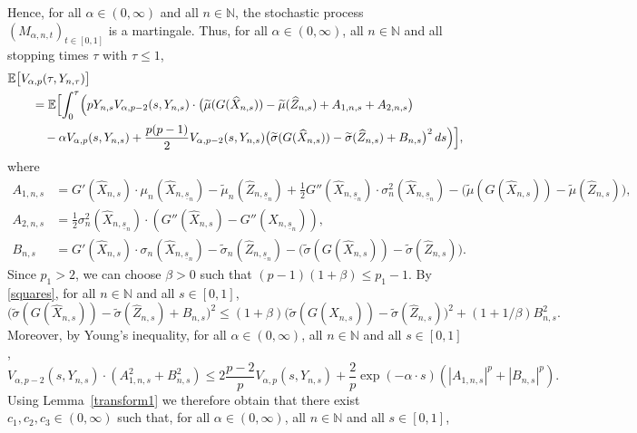 \documentclass[11pt]{amsart}
\newcommand{\N}{{\mathbb N}}
\newcommand{\EE}{{\mathbb E}}
\newcommand{\eul}{{\widehat X}}
\newcommand{\eultr}{{\widehat Z}}
\newcommand{\usn}{\underline {s}_n}
\theoremstyle{plain}
\theoremstyle{definition}
\begin{document}
Hence, for  all $\alpha\in(0, \infty)$ and all $n\in\N$,   the stochastic process $(M_{\alpha,n,t})_{t\in[0,1]}$ is
 a martingale. Thus, for all $\alpha\in(0, \infty)$, all $n\in\N$ and all stopping times $\tau$ with $\tau\le 1$,
\begin{equation}\label{stopp1}
	\begin{aligned}
		& \EE\bigl[ V_{\alpha,p}(\tau,Y_{n,\tau})\bigr] \\
		&\qquad = \EE\Bigl[ \int_0^\tau \Bigl( p Y_{n,s} V_{\alpha,p-2}(s,Y_{n,s})\cdot \bigl(\widetilde \mu(G(\widehat X_{n,s})) - \widetilde \mu(\eultr_{n,s})+ A_{1,n,s}+A_{2,n,s}\bigr) \\
				& \qquad\quad  -\alpha V_{\alpha,p}(s,Y_{n,s}) + \frac{p(p-1)}{2}   V_{\alpha,p-2}(s,Y_{n,s})\bigl( \widetilde \sigma(G(\widehat X_{n,s})) - \widetilde \sigma(\eultr_{n,s})+ B_{n,s}\bigr)^2\, ds \Bigr) \Bigr],
	\end{aligned}
\end{equation}
where
	\begin{align*}
A_{1,n,s} & = G'(\eul_{n,s})\cdot  \mu_n(\eul_{n,\usn}) - \widetilde \mu_n(\eultr_{n,\usn})+\tfrac{1}{2}G''(\eul_{n,\usn})\cdot\sigma_n^2(\eul_{n,\usn}) - \bigl(\widetilde \mu(G(\widehat X_{n,s})) - \widetilde \mu(\eultr_{n,s})\bigr),\\
A_{2,n,s} & = \tfrac{1}{2}\sigma_n^2(\eul_{n,\usn})\cdot (G''(\eul_{n,s}) - G''(\eul_{n,\usn})),\\
B_{n,s}	& =  G'(\eul_{n,s})\cdot\sigma_n(\eul_{n,\usn}) -\widetilde \sigma_n(\eultr_{n,\usn}) - \bigl( \widetilde \sigma(G(\widehat X_{n,s})) - \widetilde \sigma(\eultr_{n,s})\bigr).
	\end{align*}
Since $p_1>2$, we can choose $\beta>0$ such that $(p-1)(1+\beta)\le p_1-1$.
By \eqref{squares},
for all $n\in\N$ and all $s\in[0,1]$,
\[
\bigl( \widetilde \sigma(G(\widehat X_{n,s})) - \widetilde \sigma(\eultr_{n,s})+ B_{n,s}\bigr)^2\le (1+\beta) \bigl( \widetilde \sigma(G(\widehat X_{n,s})) - \widetilde \sigma(\eultr_{n,s})\bigr)^2 + (1+1/\beta)B_{n,s}^2.
\]
Moreover, by Young's inequality,   for all $\alpha\in(0, \infty)$,
all $n\in\N$ and all $s\in[0,1]$,
\[
 V_{\alpha,p-2}(s,Y_{n,s})\cdot (A_{1,n,s}^2 + B_{n,s}^2) \le 2 \frac{p-2}{p} V_{\alpha,p}(s,Y_{n,s}) + \frac{2}{p} \exp(-\alpha\cdot s) (|A_{1,n,s}|^p+ |B_{n,s}|^p).
\]
Using Lemma~\ref{transform1}
we therefore obtain that there exist $c_1,c_2,c_3\in (0,\infty)$ such that, for all $\alpha\in(0, \infty)$,
all $n\in\N$ and all $s\in[0,1]$,
\end{document}
